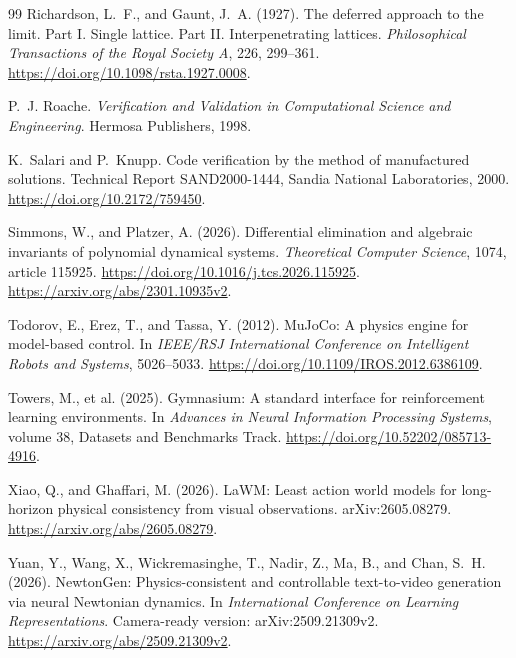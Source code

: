 \documentclass[10pt]{article}
\theoremstyle{definition}
\begin{document}
\begin{thebibliography}{99}
Richardson, L.~F., and Gaunt, J.~A. (1927). The deferred approach to the limit.
Part I. Single lattice. Part II. Interpenetrating lattices.
\emph{Philosophical Transactions of the Royal Society A}, 226, 299--361.
\newblock \url{https://doi.org/10.1098/rsta.1927.0008}.

P.~J. Roache.
\newblock \emph{Verification and Validation in Computational Science and Engineering}.
\newblock Hermosa Publishers, 1998.

K.~Salari and P.~Knupp.
\newblock Code verification by the method of manufactured solutions.
\newblock Technical Report SAND2000-1444, Sandia National Laboratories, 2000.
\newblock \url{https://doi.org/10.2172/759450}.

Simmons, W., and Platzer, A. (2026).
Differential elimination and algebraic invariants of polynomial dynamical systems.
\emph{Theoretical Computer Science}, 1074, article 115925.
\newblock \url{https://doi.org/10.1016/j.tcs.2026.115925}.
\newblock \url{https://arxiv.org/abs/2301.10935v2}.

Todorov, E., Erez, T., and Tassa, Y. (2012). MuJoCo: A physics engine for
model-based control. In \emph{IEEE/RSJ International Conference on Intelligent
Robots and Systems}, 5026--5033.
\newblock \url{https://doi.org/10.1109/IROS.2012.6386109}.

Towers, M., et al. (2025). Gymnasium: A standard interface for
reinforcement learning environments. In \emph{Advances in Neural Information
Processing Systems}, volume 38, Datasets and Benchmarks Track.
\newblock \url{https://doi.org/10.52202/085713-4916}.

Xiao, Q., and Ghaffari, M. (2026). LaWM: Least action world models for
long-horizon physical consistency from visual observations. arXiv:2605.08279.
\newblock \url{https://arxiv.org/abs/2605.08279}.

Yuan, Y., Wang, X., Wickremasinghe, T., Nadir, Z., Ma, B., and Chan, S.~H.
(2026). NewtonGen: Physics-consistent and controllable text-to-video generation
via neural Newtonian dynamics. In \emph{International Conference on Learning
Representations}. Camera-ready version: arXiv:2509.21309v2.
\newblock \url{https://arxiv.org/abs/2509.21309v2}.

\end{thebibliography}
\end{document}
